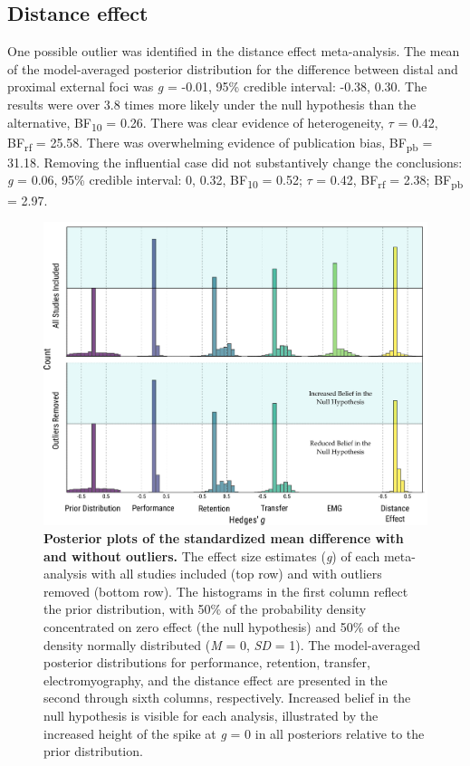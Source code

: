 \documentclass[
  11pt,
  doc, donotrepeattitle,floatsintext]{apa7}
\begin{document}
\hypertarget{distance-effect}{%
\subsection{Distance effect}\label{distance-effect}}

One possible outlier was identified in the distance effect meta-analysis. The mean of the model-averaged posterior distribution for the difference between distal and proximal external foci was \emph{g} = -0.01, 95\% credible interval: -0.38, 0.30. The results were over 3.8 times more likely under the null hypothesis than the alternative, BF\textsubscript{10} = 0.26. There was clear evidence of heterogeneity, \(\tau\) = 0.42, BF\textsubscript{rf} = 25.58. There was overwhelming evidence of publication bias, BF\textsubscript{pb} = 31.18. Removing the influential case did not substantively change the conclusions: \emph{g} = 0.06, 95\% credible interval: 0, 0.32, BF\textsubscript{10} = 0.52; \(\tau\) = 0.42, BF\textsubscript{rf} = 2.38; BF\textsubscript{pb} = 2.97.

\clearpage

\begin{figure}

{\centering \includegraphics{../../figs/fig1} 

}

\caption{\footnotesize \normalfont \textbf{Posterior plots of the standardized mean difference with and without outliers.} The effect size estimates (\emph{g}) of each meta-analysis with all studies included (top row) and with outliers removed (bottom row). The histograms in the first column reflect the prior distribution, with 50\% of the probability density concentrated on zero effect (the null hypothesis) and 50\% of the density normally distributed (\emph{M} = 0, \emph{SD} = 1). The model-averaged posterior distributions for performance, retention, transfer, electromyography, and the distance effect are presented in the second through sixth columns, respectively. Increased belief in the null hypothesis is visible for each analysis, illustrated by the increased height of the spike at \emph{g} = 0 in all posteriors relative to the prior distribution.}\label{fig:fig1}
\end{figure}
\end{document}
